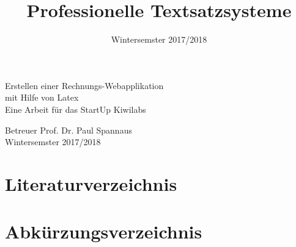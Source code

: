 
\title{Professionelle Textsatzsysteme}



    \begin{titlepage}
    
	\ClearWallPaper
    
	 \begin{center}
 		\vspace*{\fill}
 		
        \begin{LARGE}
        	Erstellen einer Rechnungs-Webapplikation \\
            mit Hilfe von Latex \\
			Eine Arbeit für das StartUp Kiwilabs \\
        \end{LARGE}
        \vspace{11pt}               
		Betreuer Prof. Dr. Paul Spannaus \\
		 \vspace{11pt}    
        Wintersemster 2017/2018
        \date{Wintersemster 2017/2018}
		\vspace*{\fill}
     	\end{center}

	\end{titlepage}	
	


\tableofcontents
\clearpage
\listoffigures
\clearpage












\chapter*{Literaturverzeichnis}
	
	
			
\chapter*{Abkürzungsverzeichnis}

	

